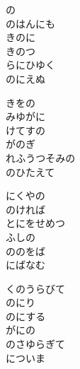 \documentclass[10pt,b5j]{tarticle} %
\begin{document}
\vspace{1.5em} %
\newcommand{\linespace}{0.5em} %
\newcommand{\blocksize}{0.5\hsize} %
\begin{enumerate} %
    \begin{minipage}[c]{\blocksize}
    
        \vspace{\linespace}
        \item
        の\\
        のはんにも\\
        きのに\\
        きのつ\\
        らにひゆく\\
        のにえぬ
        
        \vspace{\linespace}
        \item
        きをの\\
        みゆがに\\
        けてすの\\
        がのぎ\\
        れふうつそみの\\
        のひたえて
        
        \vspace{\linespace}
        \item
        にくやの\\
        のければ\\
        とにをせめつ\\
        ふしの\\
        ののをば\\
        にばなむ
        
        \vspace{\linespace}
        \item
        くのうらびて\\
        のにり\\
        のにする\\
        がにの\\
        のさゆらぎて\\
        についま
        

\end{minipage}
\end{enumerate}
\end{document}
